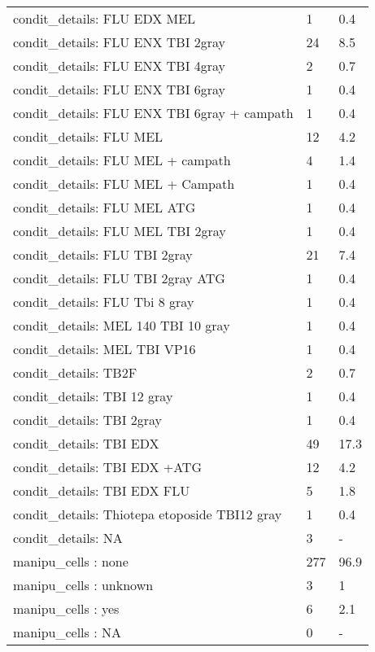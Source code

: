 \documentclass{article}
\begin{document}
\begin{longtable}{lll}
  condit_details: FLU EDX MEL & 1 & 0.4 \\ 
  condit_details: FLU ENX TBI 2gray & 24 & 8.5 \\ 
  condit_details: FLU ENX TBI 4gray & 2 & 0.7 \\ 
  condit_details: FLU ENX TBI 6gray & 1 & 0.4 \\ 
  condit_details: FLU ENX TBI 6gray + campath & 1 & 0.4 \\ 
  condit_details: FLU MEL & 12 & 4.2 \\ 
  condit_details: FLU MEL + campath & 4 & 1.4 \\ 
  condit_details: FLU MEL + Campath & 1 & 0.4 \\ 
  condit_details: FLU MEL ATG & 1 & 0.4 \\ 
  condit_details: FLU MEL TBI 2gray & 1 & 0.4 \\ 
  condit_details: FLU TBI 2gray & 21 & 7.4 \\ 
  condit_details: FLU TBI 2gray ATG & 1 & 0.4 \\ 
  condit_details: FLU Tbi 8 gray & 1 & 0.4 \\ 
  condit_details: MEL 140 TBI 10 gray & 1 & 0.4 \\ 
  condit_details: MEL TBI VP16 & 1 & 0.4 \\ 
  condit_details: TB2F & 2 & 0.7 \\ 
  condit_details: TBI 12 gray & 1 & 0.4 \\ 
  condit_details: TBI 2gray & 1 & 0.4 \\ 
  condit_details: TBI EDX & 49 & 17.3 \\ 
  condit_details: TBI EDX +ATG & 12 & 4.2 \\ 
  condit_details: TBI EDX FLU & 5 & 1.8 \\ 
  condit_details: Thiotepa etoposide TBI12 gray & 1 & 0.4 \\ 
  condit_details: NA & 3 & - \\ 
  manipu_cells
                                                                                                                : none & 277 & 96.9 \\ 
  manipu_cells
                                                                                                                : unknown & 3 & 1 \\ 
  manipu_cells
                                                                                                                : yes & 6 & 2.1 \\ 
  manipu_cells
                                                                                                                : NA & 0 & - \\ 

\end{longtable}
\end{document}
